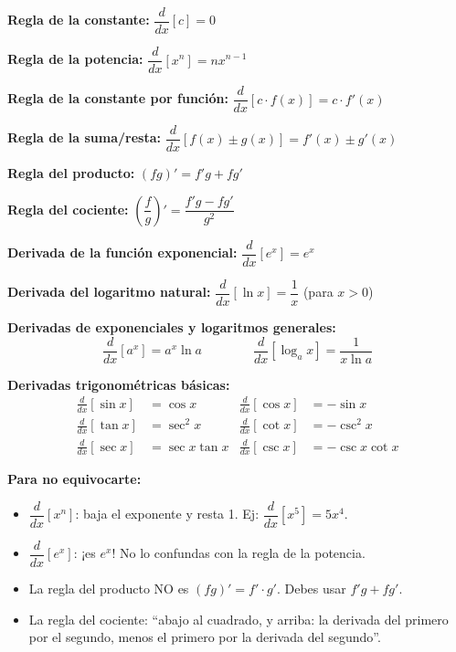 \documentclass[12pt, a4paper]{article}
\begin{document}
\begin{cuadroteoria}
  \textbf{Regla de la constante:} $\dfrac{d}{dx}[c] = 0$

  \textbf{Regla de la potencia:} $\dfrac{d}{dx}[x^n] = n x^{n-1}$

  \textbf{Regla de la constante por función:} $\dfrac{d}{dx}[c \cdot f(x)] = c \cdot f'(x)$

  \textbf{Regla de la suma/resta:} $\dfrac{d}{dx}[f(x) \pm g(x)] = f'(x) \pm g'(x)$

  \textbf{Regla del producto:} $(fg)' = f'g + fg'$

  \textbf{Regla del cociente:} $\left(\dfrac{f}{g}\right)' = \dfrac{f'g - fg'}{g^2}$

  \textbf{Derivada de la función exponencial:} $\dfrac{d}{dx}[e^x] = e^x$

  \textbf{Derivada del logaritmo natural:} $\dfrac{d}{dx}[\ln x] = \dfrac{1}{x}$ (para $x > 0$)

  \textbf{Derivadas de exponenciales y logaritmos generales:}
  $$\frac{d}{dx}[a^x] = a^x \ln a \qquad\qquad \frac{d}{dx}[\log_a x] = \frac{1}{x \ln a}$$
\end{cuadroteoria}

\begin{cuadrosolucion}
  \textbf{Derivadas trigonométricas básicas:}
  \begin{align*}
    \frac{d}{dx}[\sin x] & = \cos x        & \frac{d}{dx}[\cos x] & = -\sin x        \\
    \frac{d}{dx}[\tan x] & = \sec^2 x      & \frac{d}{dx}[\cot x] & = -\csc^2 x      \\
    \frac{d}{dx}[\sec x] & = \sec x \tan x & \frac{d}{dx}[\csc x] & = -\csc x \cot x
  \end{align*}
\end{cuadrosolucion}

\begin{cuadroadvertencia}
  \textbf{Para no equivocarte:}
  \begin{itemize}[leftmargin=*]
    \item $\dfrac{d}{dx}[x^n]$: baja el exponente y resta 1. Ej: $\dfrac{d}{dx}[x^5] = 5x^4$.
    \item $\dfrac{d}{dx}[e^x]$: ¡es $e^x$! No lo confundas con la regla de la potencia.
    \item La regla del producto NO es $(fg)' = f' \cdot g'$. Debes usar $f'g + fg'$.
    \item La regla del cociente: ``abajo al cuadrado, y arriba: la derivada del primero por el segundo, menos el primero por la derivada del segundo''.
  \end{itemize}
\end{cuadroadvertencia}
\end{document}
